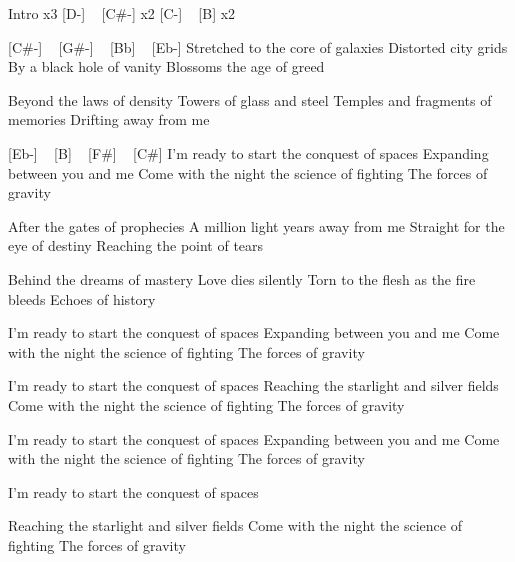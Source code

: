 Intro x3
[D-] ~ [C#-] x2
[C-] ~ [B] x2

[C#-] ~ [G#-] ~ [Bb] ~ [Eb-]
Stretched to the core of galaxies
Distorted city grids
By a black hole of vanity
Blossoms the age of greed

Beyond the laws of density
Towers of glass and steel
Temples and fragments of memories
Drifting away from me

[Eb-] ~ [B] ~ [F#] ~ [C#]
I'm ready to start the conquest of spaces
Expanding between you and me
Come with the night the science of fighting
The forces of gravity

After the gates of prophecies
A million light years away from me
Straight for the eye of destiny
Reaching the point of tears

Behind the dreams of mastery
Love dies silently
Torn to the flesh as the fire bleeds
Echoes of history

I'm ready to start the conquest of spaces
Expanding between you and me
Come with the night the science of fighting
The forces of gravity

I'm ready to start the conquest of spaces
Reaching the starlight and silver fields
Come with the night the science of fighting
The forces of gravity

I'm ready to start the conquest of spaces
Expanding between you and me
Come with the night the science of fighting
The forces of gravity

I'm ready to start the conquest of spaces

Reaching the starlight and silver fields
Come with the night the science of fighting
The forces of gravity 